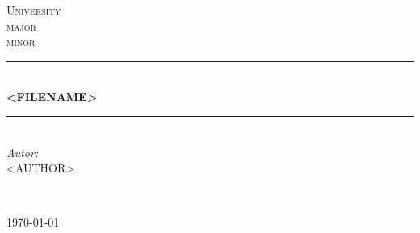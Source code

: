 \documentclass[12pt]{article} %
\begin{document}

\begin{titlepage}

\newcommand{\HRule}{\rule{\linewidth}{0.5mm}}

\center

\textsc{\LARGE University}\\[1.5cm] %
\textsc{\Large major}\\[0.5cm] %
\textsc{\large minor}\\[0.5cm] %

\HRule \\[0.4cm]
{ \huge \bfseries <FILENAME>}\\[0.4cm] %
\HRule \\[1.5cm]

\large
\emph{Autor:}\\
<AUTHOR>

~

{\large \today}\\[3cm]


\vfill %

\end{titlepage}


\renewcommand\labelitemi{\textbullet}

\tableofcontents %

\newpage %

\end{document}
